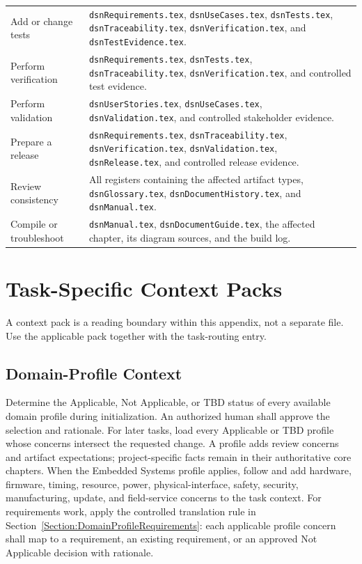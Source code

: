 \begin{tabularx}{\linewidth}{L{4.0cm}Y}
Add or change tests & \texttt{dsnRequirements.tex}, \texttt{dsnUseCases.tex}, \texttt{dsnTests.tex}, \texttt{dsnTraceability.tex}, \texttt{dsnVerification.tex}, and \texttt{dsnTestEvidence.tex}.\\
Perform verification & \texttt{dsnRequirements.tex}, \texttt{dsnTests.tex}, \texttt{dsnTraceability.tex}, \texttt{dsnVerification.tex}, and controlled test evidence.\\
Perform validation & \texttt{dsnUserStories.tex}, \texttt{dsnUseCases.tex}, \texttt{dsnValidation.tex}, and controlled stakeholder evidence.\\
Prepare a release & \texttt{dsnRequirements.tex}, \texttt{dsnTraceability.tex}, \texttt{dsnVerification.tex}, \texttt{dsnValidation.tex}, \texttt{dsnRelease.tex}, and controlled release evidence.\\
Review consistency & All registers containing the affected artifact types, \texttt{dsnGlossary.tex}, \texttt{dsnDocumentHistory.tex}, and \texttt{dsnManual.tex}.\\
Compile or troubleshoot & \texttt{dsnManual.tex}, \texttt{dsnDocumentGuide.tex}, the affected chapter, its diagram sources, and the build log.\\
\end{tabularx}
\normalsize

\section{Task-Specific Context Packs}
A context pack is a reading boundary within this appendix, not a separate file.
Use the applicable pack together with the task-routing entry.

\subsection{Domain-Profile Context}
Determine the Applicable, Not Applicable, or TBD status of every available
domain profile during initialization. An authorized human shall approve the
selection and rationale. For later tasks, load every Applicable or TBD profile
whose concerns intersect the requested change. A profile adds review concerns
and artifact expectations; project-specific facts remain in their authoritative
core chapters. When the Embedded Systems profile applies, follow
 and add hardware, firmware, timing,
resource, power, physical-interface, safety, security, manufacturing, update,
and field-service concerns to the task context. For requirements work, apply
the controlled translation rule in
Section~\ref{Section:DomainProfileRequirements}: each applicable profile
concern shall map to a requirement, an existing requirement, or an approved
Not Applicable decision with rationale.

